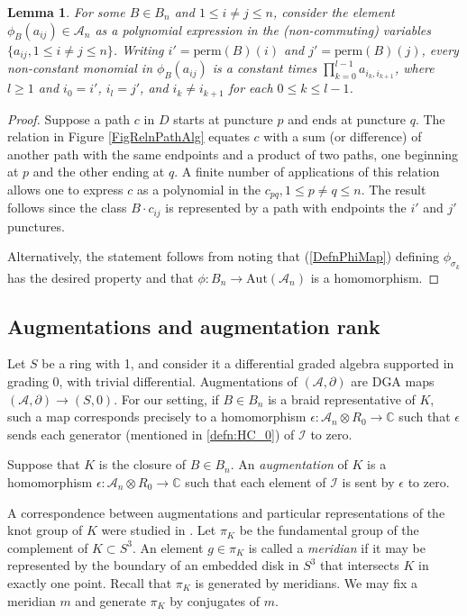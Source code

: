 \documentclass[11pt]{amsart}
\def\C{{\mathbb C}}
\def\A{{\mathcal A}}
\def\s{{\sigma}}
\newtheorem{lem}[thm]{Lemma}
\newenvironment{definition}[1][Definition]{\begin{trivlist}
\item[\hskip \labelsep {\bfseries #1}]}{\end{trivlist}}
\begin{document}
  \begin{lem} For some $B\in B_n$ and $1\le i\ne j\le n$, consider the element $\phi_B(a_{ij})\in \A_n$ as a polynomial expression in the (non-commuting) variables $\{a_{ij}, 1\le i\ne j\le n\}$. Writing $i'=\text{perm}(B)(i)$ and $j' = \text{perm}(B)(j)$, every non-constant monomial in $\phi_B(a_{ij})$ is a constant times $\prod_{k=0}^{l-1} a_{i_k,i_{k+1}}$, where $l\ge 1$ and $i_0=i'$, $i_l=j'$, and $i_k\ne i_{k+1}$ for each $0\le k\le l-1$.
  \label{lem:monomial}
  \end{lem}
  \begin{proof}Suppose a path $c$ in $D$ starts at puncture $p$ and ends at puncture $q$. The relation in Figure \ref{FigRelnPathAlg} equates $c$ with a sum (or difference) of another path with the same endpoints and a product of two paths, one beginning at $p$ and the other ending at $q$. A finite number of applications of this relation allows one to express $c$ as a polynomial in the $c_{pq},1\le p\ne q\le n$. The result follows since the class $B\cdot c_{ij}$ is represented by a path with endpoints the $i'$ and $j'$ punctures.

  Alternatively, the statement follows from noting that (\ref{DefnPhiMap}) defining $\phi_{\s_k}$ has the desired property and that $\phi:B_n\to\text{Aut}(\A_n)$ is a homomorphism.
  \end{proof}

\subsection{Augmentations and augmentation rank}
\label{SecBG_AugRk}

  Let $S$ be a ring with 1, and consider it a differential graded algebra supported in grading 0, with trivial differential. Augmentations of $(\A,\partial)$ are DGA maps $(\A,\partial)\to (S,0)$. For our setting, if $B\in B_n$ is a braid representative of $K$, such a map corresponds precisely to a homomorphism $\epsilon:\A_n\otimes R_0\to\C$ such that $\epsilon$ sends each generator (mentioned in \ref{defn:HC_0}) of $\mathcal I$ to zero.

  \begin{definition}
  Suppose that $K$ is the closure of $B\in B_n$. An \emph{augmentation} of $K$ is a homomorphism $\epsilon: \A_n\otimes R_0\rightarrow \C$ such that each element of $\mathcal I$ is sent by $\epsilon$ to zero.
  \label{defn:Aug}
  \end{definition}

  A correspondence between augmentations and particular representations of the knot group of $K$ were studied in \cite{Cor13a}. Let $\pi_K$ be the fundamental group of the complement of $K\subset S^3$. An element $g\in\pi_K$ is called a \emph{meridian} if it may be represented by the boundary of an embedded disk in $S^3$ that intersects $K$ in exactly one point. Recall that $\pi_K$ is generated by meridians. We may fix a meridian $m$ and generate $\pi_K$ by conjugates of $m$.
\end{document}
